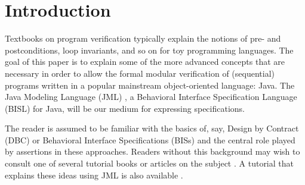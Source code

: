 \documentclass{llncs}
\begin{document}
\section{Introduction}

Textbooks on program verification
\cite{Apt-Olderog97,Francez92,Loeckx-Sieber87} typically explain the notions
of pre- and postconditions, loop invariants, and so on for toy programming
languages.
%
The goal of this paper is to explain some of the more advanced concepts that
are necessary in order to allow the formal modular verification of
(sequential) programs written in a popular mainstream object-oriented
language: Java.
%
The Java Modeling Language (JML)
\cite{STTT05,Leavens-Baker-Ruby06,Leavens-etal05a}, a Behavioral Interface
Specification Language (BISL) \cite{Wing90a} for Java, will be our medium for
expressing specifications.

The reader is assumed to be familiar with the basics of, say, Design by
Contract (DBC) \cite{Meyer97} or Behavioral Interface Specifications (BISs)
and the central role played by assertions in these approaches.
%
%
%
Readers without this background may wish to consult one of several tutorial
books or articles on the subject
\cite{Hoare69,Liskov-Guttag01,Mitchell-McKim02,Meyer92a,Meyer97,Morgan94}.
%
A tutorial that explains these ideas using JML is also available
\cite{Leavens-Cheon05}.
\end{document}
